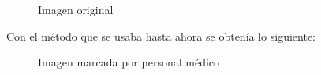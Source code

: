     \begin{figure}[H]
      \caption{Imagen original}
      \centering \setlength\fboxsep{0pt} \setlength\fboxrule{0.5pt}
    \end{figure}

Con el método que se usaba hasta ahora se obtenía lo siguiente:

    \begin{figure}[H]
      \caption{Imagen marcada por personal médico}
      \centering \setlength\fboxsep{0pt} \setlength\fboxrule{0.5pt}
    \end{figure}

